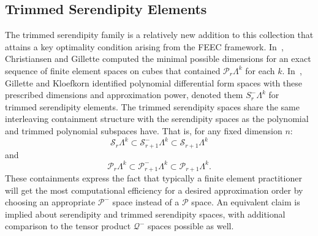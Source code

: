\documentclass[manuscript,screen]{acmart}
\newcommand{\calP}{\mathcal{P}}
\newcommand{\calQ}{\mathcal{Q}}
\newcommand{\calS}{\mathcal{S}}
\begin{document}
  \subsection{Trimmed Serendipity Elements}
    The trimmed serendipity family is a relatively new addition to this collection that attains a key optimality condition arising from the FEEC framework.
	In~\cite{christiansen2016constructions}, Christiansen and Gillette computed the minimal possible dimensions for an exact sequence of finite element spaces on cubes that contained $\calP_r\Lambda^k$ for each $k$.
	In~\cite{gillette2019trimmed}, Gillette and Kloefkorn identified polynomial differential form spaces with these prescribed dimensions and approximation power, denoted them $S^-_r\Lambda^k$ for trimmed serendipity elements.  
	The trimmed serendipity spaces share the same interleaving containment structure with the serendipity spaces as the polynomial and trimmed polynomial subspaces have.  That is, for any fixed dimension $n$:
\begin{equation*}
      \calS_r \Lambda^k \subset \calS^-_{r+1} \Lambda^k \subset \calS_{r+1} \Lambda^k
  \end{equation*}
 \noindent and   
   \begin{equation*}
      \calP_r \Lambda^k \subset \calP^-_{r+1} \Lambda^k \subset \calP_{r+1} \Lambda^k.
  \end{equation*}
	These containments express the fact that typically a finite element practitioner will get the most computational efficiency for a desired approximation order by choosing an appropriate $\calP^-$ space instead of a $\calP$ space.
	An equivalent claim is implied about serendipity and trimmed serendipity spaces, with additional comparison to the tensor product $\calQ^-$ spaces possible as well.

    
    
  
\end{document}

